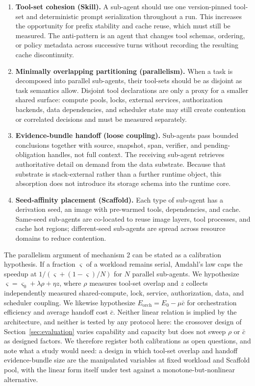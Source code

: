 \documentclass[11pt]{article}
\begin{document}
\begin{enumerate}
\item \textbf{Tool-set cohesion (Skill).} A sub-agent should use one version-pinned tool-set and deterministic prompt serialization throughout a run. This increases the opportunity for prefix stability and cache reuse, which must still be measured. The anti-pattern is an agent that changes tool schemas, ordering, or policy metadata across successive turns without recording the resulting cache discontinuity.
\item \textbf{Minimally overlapping partitioning (parallelism).} When a task is decomposed into parallel sub-agents, their tool-sets should be as disjoint as task semantics allow. Disjoint tool declarations are only a proxy for a smaller shared surface: compute pools, locks, external services, authorization backends, data dependencies, and scheduler state may still create contention or correlated decisions and must be measured separately.
\item \textbf{Evidence-bundle handoff (loose coupling).} Sub-agents pass bounded conclusions together with source, snapshot, span, verifier, and pending-obligation handles, not full context. The receiving sub-agent retrieves authoritative detail on demand from the data substrate. Because that substrate is stack-external rather than a further runtime object, this absorption does not introduce its storage schema into the runtime core.
\item \textbf{Seed-affinity placement (Scaffold).} Each type of sub-agent has a derivation seed, an image with pre-warmed tools, dependencies, and cache. Same-seed sub-agents are co-located to reuse image layers, tool processes, and cache hot regions; different-seed sub-agents are spread across resource domains to reduce contention.
\end{enumerate}

The parallelism argument of mechanism 2 can be stated as a calibration hypothesis. If a fraction $\varsigma$ of a workload remains serial, Amdahl's law caps the speedup at $1/(\varsigma+(1-\varsigma)/N)$ for $N$ parallel sub-agents. We hypothesize $\varsigma=\varsigma_0+\lambda\rho+\eta z$, where $\rho$ measures tool-set overlap and $z$ collects independently measured shared-compute, lock, service, authorization, data, and scheduler coupling. We likewise hypothesize $E_{\mathrm{orch}}=E_0-\mu\bar{c}$ for orchestration efficiency and average handoff cost $\bar{c}$. Neither linear relation is implied by the architecture, and neither is tested by any protocol here: the crossover design of Section~\ref{sec:evaluation} varies capability and capacity but does not sweep $\rho$ or $\bar{c}$ as designed factors. We therefore register both calibrations as open questions, and note what a study would need: a design in which tool-set overlap and handoff evidence-bundle size are the manipulated variables at fixed workload and Scaffold pool, with the linear form itself under test against a monotone-but-nonlinear alternative.
\end{document}
